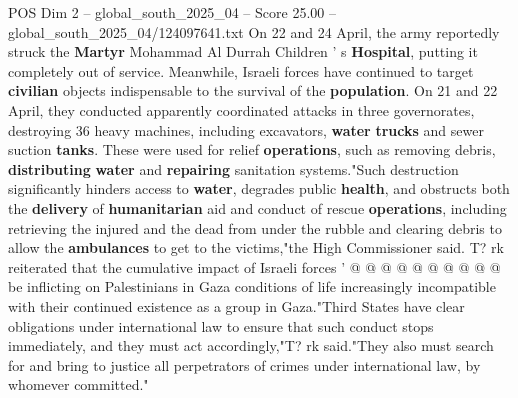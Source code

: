 \begin{textsample}{POS Dim 2 – global\_south\_2025\_04 – Score 25.00 – global\_south\_2025\_04/124097641.txt}
On 22 and 24 April, the army reportedly struck the \textbf{Martyr} Mohammad Al Durrah Children ' s \textbf{Hospital}, putting it completely out of service.
Meanwhile, Israeli forces have continued to target \textbf{civilian} objects indispensable to the survival of the \textbf{population}.
On 21 and 22 April, they conducted apparently coordinated attacks in three governorates, destroying 36 heavy machines, including excavators, \textbf{water} \textbf{trucks} and sewer suction \textbf{tanks}.
These were used for relief \textbf{operations}, such as removing debris, \textbf{distributing} \textbf{water} and \textbf{repairing} sanitation systems."Such destruction significantly hinders access to \textbf{water}, degrades public \textbf{health}, and obstructs both the \textbf{delivery} of \textbf{humanitarian} aid and conduct of rescue \textbf{operations}, including retrieving the injured and the dead from under the rubble and clearing debris to allow the \textbf{ambulances} to get to the victims,"the High Commissioner said.
T? rk reiterated that the cumulative impact of Israeli forces ' @ @ @ @ @ @ @ @ @ @ be inflicting on Palestinians in Gaza conditions of life increasingly incompatible with their continued existence as a group in Gaza."Third States have clear obligations under international law to ensure that such conduct stops immediately, and they must act accordingly,"T? rk said."They also must search for and bring to justice all perpetrators of crimes under international law, by whomever committed."

\end{textsample}
